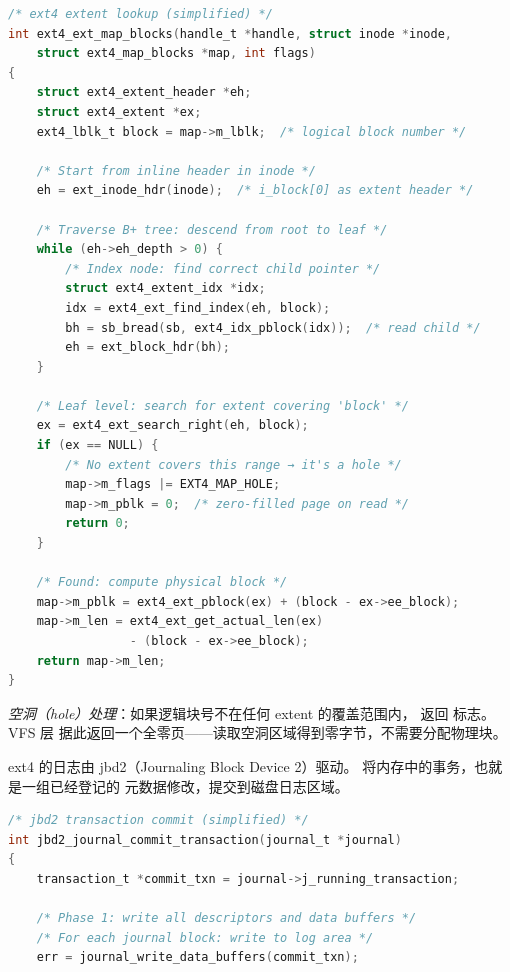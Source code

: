 \begin{filesystemlayout}
\begin{lstlisting}[language=C]
/* ext4 extent lookup (simplified) */
int ext4_ext_map_blocks(handle_t *handle, struct inode *inode,
    struct ext4_map_blocks *map, int flags)
{
    struct ext4_extent_header *eh;
    struct ext4_extent *ex;
    ext4_lblk_t block = map->m_lblk;  /* logical block number */

    /* Start from inline header in inode */
    eh = ext_inode_hdr(inode);  /* i_block[0] as extent header */

    /* Traverse B+ tree: descend from root to leaf */
    while (eh->eh_depth > 0) {
        /* Index node: find correct child pointer */
        struct ext4_extent_idx *idx;
        idx = ext4_ext_find_index(eh, block);
        bh = sb_bread(sb, ext4_idx_pblock(idx));  /* read child */
        eh = ext_block_hdr(bh);
    }

    /* Leaf level: search for extent covering 'block' */
    ex = ext4_ext_search_right(eh, block);
    if (ex == NULL) {
        /* No extent covers this range → it's a hole */
        map->m_flags |= EXT4_MAP_HOLE;
        map->m_pblk = 0;  /* zero-filled page on read */
        return 0;
    }

    /* Found: compute physical block */
    map->m_pblk = ext4_ext_pblock(ex) + (block - ex->ee_block);
    map->m_len = ext4_ext_get_actual_len(ex)
                 - (block - ex->ee_block);
    return map->m_len;
}
\end{lstlisting}

\emph{空洞（hole）处理}：如果逻辑块号不在任何 extent 的覆盖范围内，
 返回  标志。VFS 层
据此返回一个全零页——读取空洞区域得到零字节，不需要分配物理块。


ext4 的日志由 jbd2（Journaling Block Device 2）驱动。
 将内存中的事务，也就是一组已经登记的
元数据修改，提交到磁盘日志区域。

\begin{lstlisting}[language=C]
/* jbd2 transaction commit (simplified) */
int jbd2_journal_commit_transaction(journal_t *journal)
{
    transaction_t *commit_txn = journal->j_running_transaction;

    /* Phase 1: write all descriptors and data buffers */
    /* For each journal block: write to log area */
    err = journal_write_data_buffers(commit_txn);


\end{lstlisting}
\end{filesystemlayout}
